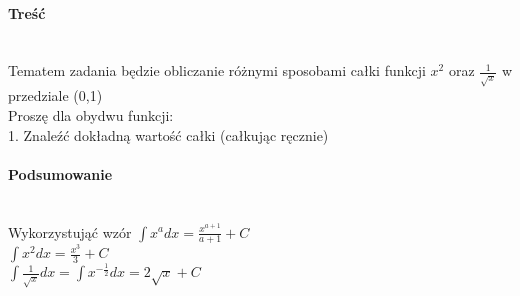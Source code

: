 \paragraph{Treść}~\\
Tematem zadania będzie obliczanie różnymi sposobami całki funkcji $ x^2 $ oraz $ \frac{1}{\sqrt{x}} $ w przedziale (0,1)\\
Proszę dla obydwu funkcji:\\
1. Znaleźć dokładną wartość całki (całkując ręcznie)

\paragraph{Podsumowanie}~\\
Wykorzystująć wzór $ \int x^a dx = \frac{x^{a+1}}{a+1} + C $\\
$ \int x^2 dx = \frac{x^3}{3} + C $\\
$ \int \frac{1}{\sqrt{x}} dx = \int x^{-\frac{1}{2}} dx = 2\sqrt{x} + C $
